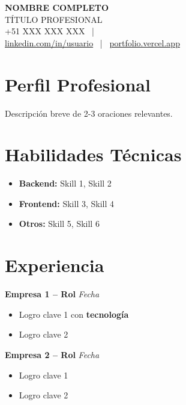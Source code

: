 \documentclass[11pt,a4paper]{article}
\begin{document}
\begin{center}
    {\Large \textbf{NOMBRE COMPLETO}} \\[-2pt]
    \textcolor{secondary}{TÍTULO PROFESIONAL} \\[4pt]
    +51 XXX XXX XXX \ | \
     \\[-2pt]
    \href{https://linkedin.com/in/usuario}{linkedin.com/in/usuario} \ | \
    \href{https://portfolio.vercel.app}{portfolio.vercel.app}
\end{center}

\section*{Perfil Profesional}

Descripción breve de 2-3 oraciones relevantes.

\section*{Habilidades Técnicas}
\begin{itemize}
  \item \textbf{Backend:} Skill 1, Skill 2
  \item \textbf{Frontend:} Skill 3, Skill 4
  \item \textbf{Otros:} Skill 5, Skill 6
\end{itemize}

\section*{Experiencia}

\noindent\textbf{Empresa 1 – Rol} \hfill\textit{Fecha}
\begin{itemize}
  \item Logro clave 1 con \textbf{tecnología}
  \item Logro clave 2
\end{itemize}

\noindent\textbf{Empresa 2 – Rol} \hfill\textit{Fecha}
\begin{itemize}
  \item Logro clave 1
  \item Logro clave 2
\end{itemize}

\end{document}
